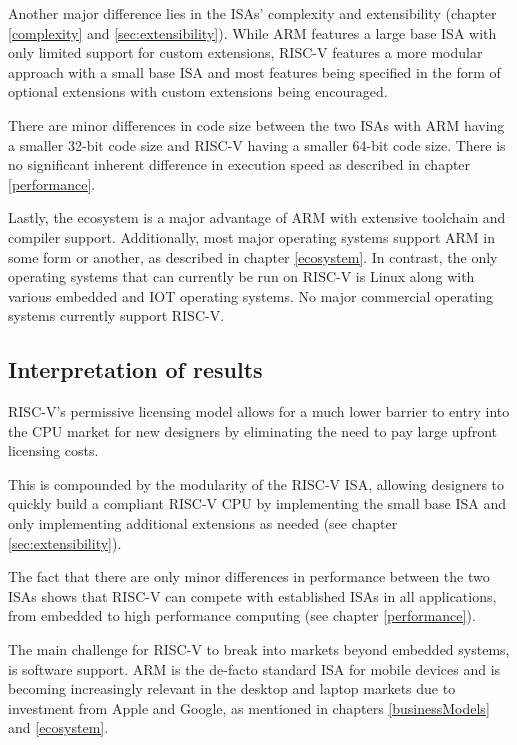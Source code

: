\documentclass[conference]{IEEEtran}
\begin{document}
	Another major difference lies in the \glspl{ISA}' complexity and extensibility (chapter \ref{complexity} and \ref{sec:extensibility}).
	While ARM features a large base \gls{ISA} with only limited support for custom extensions, RISC-V features a more modular
	approach with a small base \gls{ISA} and most features being specified in the form of optional extensions with custom extensions being
	encouraged.

	There are minor differences in code size between the two \glspl{ISA} with ARM having a smaller 32-bit code size and RISC-V having a
	smaller 64-bit code size. There is no significant inherent difference in execution speed as described in chapter \ref{performance}.

	Lastly, the ecosystem is a major advantage of ARM with extensive toolchain and compiler support. Additionally, most major operating systems
	support ARM in some form or another, as described in chapter \ref{ecosystem}.
	In contrast, the only operating systems that can currently be run on RISC-V is Linux along with various embedded and IOT operating systems.
	No major commercial operating systems currently support RISC-V.

	\subsection{Interpretation of results}
	\label{ref:interpretation}
	RISC-V's permissive licensing model allows for a much lower barrier to entry into the \gls{CPU} market for new designers
	by eliminating the need to pay large upfront licensing costs.
	
	This is compounded by the modularity of the RISC-V \gls{ISA}, allowing designers to quickly build a compliant RISC-V \gls{CPU}
	by implementing the small base \gls{ISA} and only implementing additional extensions as needed (see chapter \ref{sec:extensibility}).

	The fact that there are only minor differences in performance between the two \glspl{ISA} shows that RISC-V can
	compete with established \glspl{ISA} in all applications, from embedded to high performance computing (see chapter \ref{performance}).

	The main challenge for RISC-V to break into markets beyond embedded systems, is software support.
	ARM is the de-facto standard \gls{ISA} for mobile devices and is becoming increasingly relevant in the desktop and laptop markets
	due to investment from Apple and Google, as mentioned in chapters \ref{businessModels} and \ref{ecosystem}.
	
\end{document}

